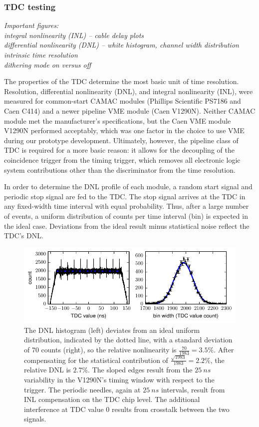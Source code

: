 \subsubsection{TDC testing}

{\it Important figures:\\
integral nonlinearity (INL) -- cable delay plots \\
differential nonlinearity (DNL) -- white histogram, channel width distribution\\
intrinsic time resolution\\
dithering mode on versus off\\
}



The properties of the TDC determine the most basic unit of time resolution. Resolution, differential nonlinearity (DNL), and integral nonlinearity (INL), were measured for common-start CAMAC modules (Phillips Scientific PS7186 and Caen C414) and a newer pipeline VME module (Caen V1290N). Neither CAMAC module met the manufacturer's specifications, but the Caen VME module V1290N performed acceptably, which was one factor in the choice to use VME during our prototype development.  Ultimately, however, the pipeline class of TDC is required for a more basic reason: it allows for the decoupling of the coincidence trigger from the timing trigger, which removes all electronic logic system contributions other than the discriminator from the time resolution.

In order to determine the DNL profile of each module, a random start signal and periodic stop signal are fed to the TDC. The stop signal arrives at the TDC in any fixed-width time interval with equal probability.  Thus, after a large number of events, a uniform distribution of counts per time interval (bin) is expected in the ideal case. Deviations from the ideal result minus statistical noise reflect the TDC's DNL.

\begin{figure}[]
\centering
\includegraphics[]{evan/fig_evan_tdc_testing/tdc_dnl_v1290n.pdf} %
\caption{The DNL histogram (left) deviates from an ideal uniform distribution, indicated by the dotted line, with a standard deviation of 70 counts (right), so the relative nonlinearity is $\frac{70}{1983} = 3.5\%$. After compensating for the statistical contribution of $\frac{\sqrt{1983}}{1983} = 2.2\%$, the relative DNL is $2.7\%$. The sloped edges result from the $25\:ns$ variability in the V1290N's timing window with respect to the trigger. The periodic needles, again at $25\:ns$ intervals, result from INL compensation on the TDC chip level.\cite{v1290n-man} The additional interference at TDC value $0$ results from crosstalk between the two signals.\label{fig:tdcDNL}}
\end{figure}

